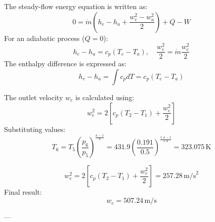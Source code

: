 The steady-flow energy equation is written as:  
\[
0 = \dot{m} \left( h_e - h_a + \frac{w_e^2 - w_a^2}{2} \right) + Q - W
\]  
For an adiabatic process (\( Q = 0 \)):  
\[
h_e - h_a = c_p (T_e - T_a), \quad \frac{w_e^2}{2} = \dot{m} \frac{w_e^2}{2}
\]  
The enthalpy difference is expressed as:  
\[
h_e - h_a = \int c_p dT = c_p (T_e - T_a)
\]  

The outlet velocity \( w_e \) is calculated using:  
\[
w_e^2 = 2 \left[ c_p (T_2 - T_1) + \frac{w_c^2}{2} \right]
\]  
Substituting values:  
\[
T_6 = T_5 \left( \frac{p_6}{p_5} \right)^{\frac{\kappa - 1}{\kappa}} = 431.9 \left( \frac{0.191}{0.5} \right)^{\frac{1.4 - 1}{1.4}} = 323.075 \, \text{K}
\]  

\[
w_e^2 = 2 \left[ c_p (T_2 - T_1) + \frac{w_c^2}{2} \right] = 257.28 \, \text{m/s}^2
\]  
Final result:  
\[
w_e = 507.24 \, \text{m/s}
\]

---